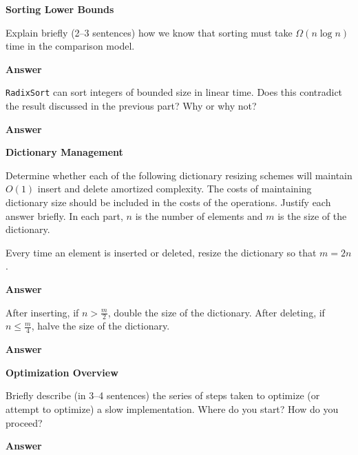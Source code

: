\documentclass[12pt,twoside]{article}
\newcommand{\answer}{
 \par\medskip
 \textbf{Answer}
}
\newcommand{\answerIIIa}{ \answer

}
\newcommand{\answerIIIb}{ \answer

}
\newcommand{\answerIVa}{ \answer

}
\newcommand{\answerIVb}{ \answer

}
\newcommand{\answerV}{ \answer

}
\begin{document}
\begin{problems}
\begin{problemparts}
\end{problemparts}

\problem {} \textbf{Sorting Lower Bounds}

\begin{problemparts}

	\problempart \label{nlogn} 
	Explain briefly (2--3 sentences) how we know that sorting must take
	$\Omega(n\log n)$time in the comparison model.

	\answerIIIa

	\problempart {}
	\texttt{RadixSort} can sort integers of bounded size in linear time.
	Does this contradict the result discussed in the previous part? Why or why not?

	\answerIIIb

\end{problemparts}

\problem {} \textbf{Dictionary Management}

Determine whether each of the following dictionary resizing schemes will maintain
$O(1)$ insert and delete amortized complexity. The costs of
maintaining dictionary size should be included in the costs of the operations.
Justify each answer briefly. In each part, $n$ is the number of elements and $m$
is the size of the dictionary.

\begin{problemparts}

	\problempart {} Every time an element is inserted or deleted, resize
	the dictionary so that $m = 2n$.

	\answerIVa

	\problempart {} After inserting, if $n > \frac{m}{2}$, double
	the size of the dictionary. After deleting, if $n \leq \frac{m}{4}$, halve
	the size of the dictionary.

	\answerIVb

\end{problemparts}

\problem {} \textbf{Optimization Overview}


Briefly describe (in 3--4 sentences) the series of steps taken to optimize (or
attempt to optimize) a slow implementation. Where do you start? How do you proceed?

\answerV

\end{problems}
\end{document}
